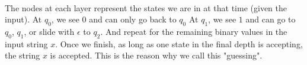 \documentclass[11pt,a4paper]{article}
\begin{document}
\begin{example}
     \\

    The nodes at each layer represent the states we are in at that time (given the input). At $q_0$, we see $0$ and can only go back to $q_0$
    At $q_1$, we see $1$ and can go to $q_0$, $q_1$, or slide with $\epsilon$ to $q_2$. And repeat for the remaining binary values in the input string $x$.
    Once we finish, as long as one state in the final depth is accepting, the string $x$ is accepted. This is the reason why we call this "guessing".
\end{example}
\end{document}
